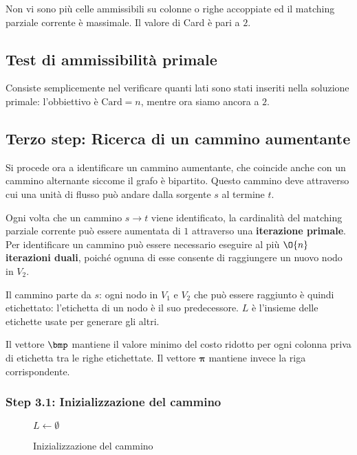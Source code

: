 \documentclass[\main/main.tex]{subfiles}
\begin{document}
Non vi sono più celle ammissibili su colonne o righe accoppiate ed il matching parziale corrente è massimale. Il valore di Card è pari a \(2\).

\subsection{Test di ammissibilità primale}
Consiste semplicemente nel verificare quanti lati sono stati inseriti nella soluzione primale: l'obbiettivo è \(\text{Card} = n\), mentre ora siamo ancora a \(2\).
\clearpage
\subsection{Terzo step: Ricerca di un cammino aumentante}
Si procede ora a identificare un cammino aumentante, che coincide anche con un cammino alternante siccome il grafo è bipartito. Questo cammino deve attraverso cui una unità di flusso può andare dalla sorgente \(s\) al termine \(t\).

Ogni volta che un cammino \(s\rightarrow t\) viene identificato, la cardinalità del matching parziale corrente può essere aumentata di \(1\) attraverso una \textbf{iterazione primale}. Per identificare un cammino può essere necessario eseguire al più \(\O{n}\) \textbf{iterazioni duali}, poiché ognuna di esse consente di raggiungere un nuovo nodo in \(V_2\).

Il cammino parte da \(s\): ogni nodo in \(V_1\) e \(V_2\) che può essere raggiunto è quindi etichettato: l'etichetta di un nodo è il suo predecessore. \(L\) è l'insieme delle etichette usate per generare gli altri.

Il vettore \(\bmp \) mantiene il valore minimo del costo ridotto per ogni colonna priva di etichetta tra le righe etichettate. Il vettore \(\bm{\pi} \) mantiene invece la riga corrispondente.

\subsubsection{Step 3.1: Inizializzazione del cammino}
\begin{figure}
	\begin{algorithm}[H]
		\SetAlgoLined
		\(L\leftarrow \emptyset\)\;
		\caption{Inizializzazione del cammino}
	\end{algorithm}
\end{figure}
\end{document}
